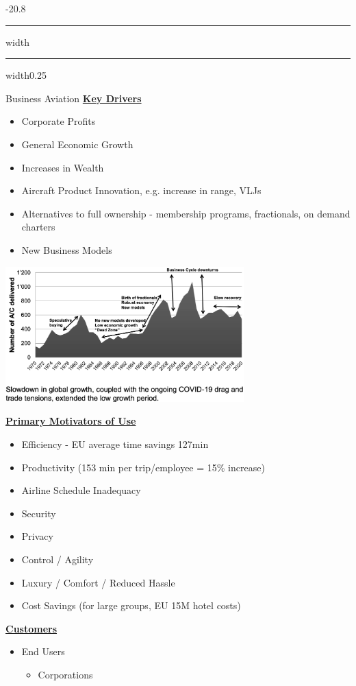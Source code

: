 \documentclass[9pt, landscape, fleqn]{scrartcl}
\makeatletter
\renewcommand{\section}{\@startsection{section}{1}{0mm}%
{-2\baselineskip}{0.8\baselineskip}%
{\hrule depth 0.2pt width\columnwidth\hrule depth1.5pt
width0.25\columnwidth\vspace*{1.2em}\Large\bfseries\rmfamily}}
\makeatother
\begin{document}
\begin{multicols*}{3}
\section{Business Aviation}
\underline{\textbf{Key Drivers}}
\begin{itemize}
    \item Corporate Profits
    \item General Economic Growth 
    \item Increases in Wealth 
    \item Aircraft Product Innovation, e.g. increase in range, VLJs
    \item Alternatives to full ownership - membership programs, fractionals, on demand charters 
    \item New Business Models
\end{itemize}
\begin{center}
    \includegraphics[width=9.2cm]{Images/Global_Business_Jet_Deliveries.png}
\end{center}
\underline{\textbf{Primary Motivators of Use}}
\begin{itemize}
    \item Efficiency - EU average time savings 127min 
    \item Productivity (153 min per trip/employee = 15\% increase)
    \item Airline Schedule Inadequacy 
    \item Security 
    \item Privacy
    \item Control / Agility 
    \item Luxury / Comfort / Reduced Hassle 
    \item Cost Savings (for large groups, EU 15M hotel costs)
\end{itemize}
\underline{\textbf{Customers}}
\begin{itemize}
    \item End Users 
    \begin{itemize}
        \item Corporations 

\end{itemize}
\end{itemize}
\end{multicols*}
\end{document}
